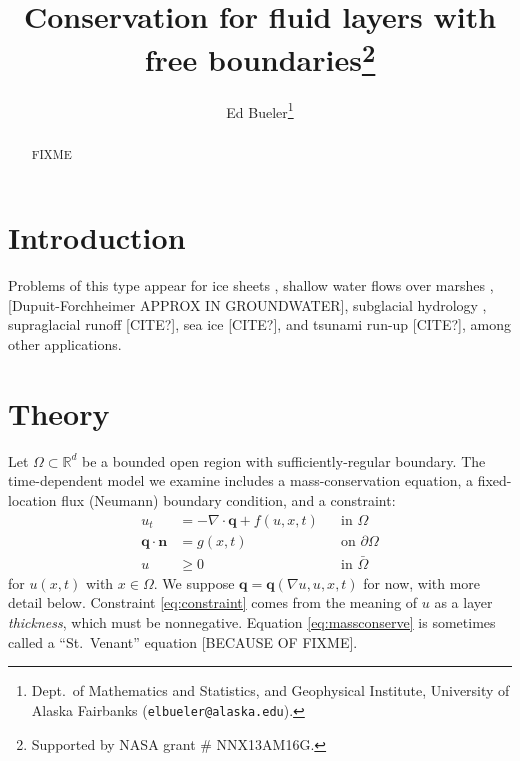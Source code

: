 \documentclass[final,leqno,onefignum,onetabnum]{siamltex1213bueler}
\title{Conservation for fluid layers with free boundaries\thanks{Supported by NASA grant \# NNX13AM16G.}}
\author{Ed Bueler\thanks{Dept.~of Mathematics and Statistics, and Geophysical Institute, University of Alaska Fairbanks (\texttt{elbueler@alaska.edu}).}}
\newcommand\bn{\mathbf{n}}
\newcommand\bq{\mathbf{q}}
\newcommand{\Div}{\nabla\cdot}
\renewcommand{\grad}{\nabla}
\newcommand\RR{\mathbb{R}}
\begin{document}
\maketitle
{}%

\begin{abstract}
FIXME
\end{abstract}




\pagestyle{myheadings}
\thispagestyle{plain}

\section{Introduction}

Problems of this type appear for ice sheets \cite{JouvetBueler2012}, shallow water flows over marshes \cite{AlonsoSantillanaDawson}, [Dupuit-Forchheimer APPROX IN GROUNDWATER], subglacial hydrology \cite{AschwandenBuelerKhroulevBlatter,BuelervanPeltDRAFT,Schoofetal2012}, supraglacial runoff [CITE?], sea ice [CITE?], and tsunami run-up [CITE?], among other applications.

\section{Theory}

Let $\Omega \subset \RR^d$ be a bounded open region with sufficiently-regular boundary.  The time-dependent model we examine includes a mass-conservation equation, a fixed-location flux (Neumann) boundary condition, and a constraint:
\begin{align}
u_t &= - \Div \bq + f(u,x,t) &&\text{in } \Omega \label{eq:massconserve} \\
\bq \cdot \bn &= g(x,t) &&\text{on } \partial\Omega \label{eq:fixedneumann} \\
u &\ge 0 &&\text{in } \bar\Omega \label{eq:constraint}
\end{align}
for $u(x,t)$ with $x\in \Omega$.  We suppose $\bq = \bq(\grad u, u, x, t)$ for now, with more detail below.  Constraint \eqref{eq:constraint} comes from the meaning of $u$ as a layer \emph{thickness}, which must be nonnegative.  Equation \eqref{eq:massconserve} is sometimes called a ``St.~Venant'' equation [BECAUSE OF FIXME].
\end{document}
